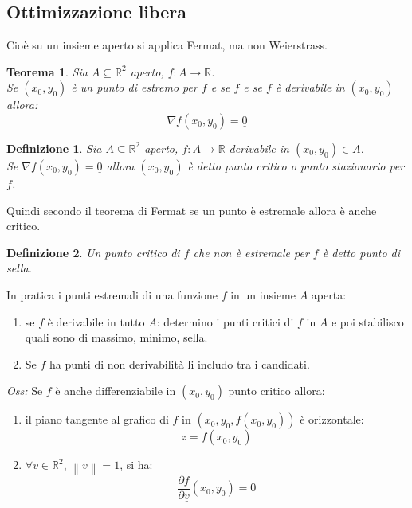\documentclass{scrreprt}
\newtheorem{defn}{Definizione}
\newenvironment{definition}{\begin{mdframed}[backgroundcolor=Ivory2]\begin{defn}}{\end{defn}\end{mdframed}}
\newtheorem{teorema}{Teorema}
\newenvironment{thm}{\begin{mdframed}[backgroundcolor=Ivory2]\begin{teorema}}{\end{teorema}\end{mdframed}}
\begin{document}
\subsection{Ottimizzazione libera}
Cioè su un insieme aperto si applica Fermat, ma non Weierstrass.
\begin{thm}
	Sia $A \subseteq \mathbb{R}^2$ aperto, $f: A \to \mathbb{R}$.\\
	Se $(x_0,y_0)$ è un punto di estremo per $f$ e se $f$ e se $f$ è derivabile in $(x_0,y_0)$ allora:
	\begin{equation}
		\nabla f(x_0,y_0) = \underline{0}
	\end{equation}
\end{thm}
\begin{definition}
	Sia $A \subseteq \mathbb{R}^2$ aperto, $f: A \to \mathbb{R}$ derivabile in $(x_0,y_0) \in A$.\\
	Se $\nabla f(x_0,y_0) = \underline{0}$ allora $(x_0,y_0)$ è detto punto critico o punto stazionario per $f$.
\end{definition}
Quindi secondo il teorema di Fermat se un punto è estremale allora è anche critico.

\begin{definition}
	Un punto critico di $f$ che non è estremale per $f$ è detto punto di sella.
\end{definition}
In pratica i punti estremali di una funzione $f$ in un insieme $A$ aperta:
\begin{enumerate}
	\item se $f$ è derivabile in tutto $A$: determino i punti critici di $f$ in $A$ e poi stabilisco quali sono di massimo, minimo, sella.
	\item Se $f$ ha punti di non derivabilità li includo tra i candidati.
\end{enumerate}
\emph{Oss:} Se $f$ è anche differenziabile in $(x_0, y_0)$ punto critico allora:
\begin{enumerate}
	\item il piano tangente al grafico di $f$ in $(x_0, y_0, f(x_0, y_0))$ è orizzontale:
			\begin{equation}
				z = f(x_0, y_0)
			\end{equation}
	\item $\forall \underline{v} \in \mathbb{R}^2$, $\left\lVert \underline{v} \right\rVert = 1$, si ha:
			\begin{equation}
				\frac{\partial f}{\partial \underline{v}}(x_0, y_0) = 0
			\end{equation}
\end{enumerate}
\end{document}

